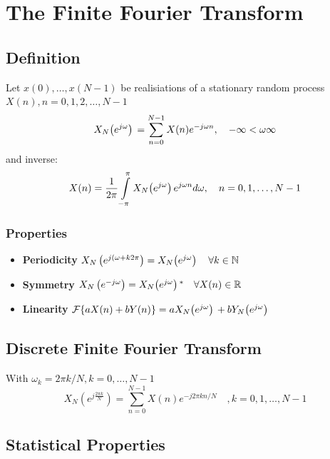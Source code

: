 \documentclass[accentcolor=tud4c,9.5pt,nochapname,bigchapter,paper=a5report]{tudreport}
\begin{document}
\chapter{The Finite Fourier Transform}
\section{Definition}
Let $x(0),\ldots,x(N-1)$ be realisiations of a stationary random process $X(n),n=0,1,2,\ldots,N-1$
\begin{equation}
X_N{\left(e^{j\omega}\right)}\, = \sum\limits_{n=0}^{N-1}X(n)e^{-j\omega n}, \quad -\infty < \omega \infty 
\end{equation} 
and inverse:
\begin{equation}
X(n)=\frac{1}{2\pi}\int\limits_{-\pi}^{\pi}X_N{\left(e^{j\omega}\right)}\, e^{j\omega n}d\omega, \quad n=0,1,\ldots,N-1
\end{equation}

\subsection{Properties}
\begin{itemize}
  \item {\bf Periodicity} $X_N\left(e^{j(\omega +k2\pi}\right)=X_N{\left(e^{j\omega}\right)}\,\quad\forall k \in \mathbb{N}$
  \item {\bf Symmetry} $X_N\left(e^{-j\omega}\right)=X_N{\left(e^{j\omega}\right)}\,^{*}\quad \forall X(n) \in \mathbb{R}$
  \item {\bf Linearity} $\mathcal{F}\{aX(n)+bY(n)\} = aX_N{\left(e^{j\omega}\right)}\, + bY_N{\left(e^{j\omega}\right)}\,$
\end{itemize}
\section{Discrete Finite Fourier Transform}
With $\omega_k=2\pi k/N, k=0,\ldots,N-1$
\begin{equation}
X_N(e^{j\frac{2\pi k}{N}})=\sum\limits_{n=0}^{N-1}X(n)e^{-j2\pi kn/N} \quad,k=0,1,\ldots,N-1
\end{equation}

\section{Statistical Properties}
\end{document}
